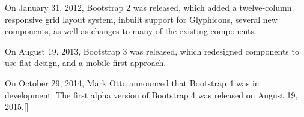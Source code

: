 On January 31, 2012, Bootstrap 2 was released, which added a twelve-column responsive grid layout system, inbuilt support for Glyphicons, several new components, as well as changes to many of the existing components.
\newline

On August 19, 2013, Bootstrap 3 was released, which redesigned components to use flat design, and a mobile first approach.
\newline

On October 29, 2014, Mark Otto announced that Bootstrap 4 was in development. The first alpha version of Bootstrap 4 was released on August 19, 2015.[\cite{1}]  
%

%

